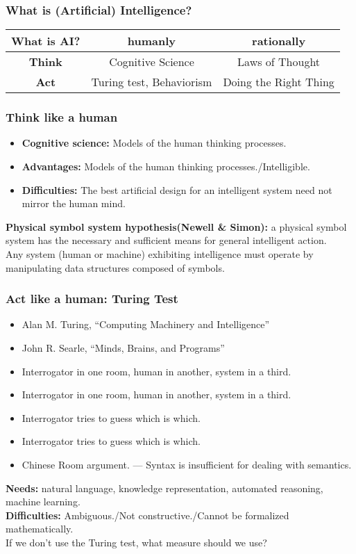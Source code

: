 \documentclass[UTF8,11pt,colorlinks,compress,openany]{beamer}%
\begin{document}
\begin{frame}\frametitle{What is (Artificial) Intelligence?}
\begin{table}
\begin{tabu}{c|c|c}
\hline
\textbf{What is AI?} &\textbf{humanly} &\textbf{rationally}\\
\hline
\textbf{Think} &Cognitive Science &Laws of Thought\\
\hline
\textbf{Act} &Turing test, Behaviorism &Doing the Right Thing\\
\hline
\end{tabu}
\end{table}
\end{frame}

\begin{frame}\frametitle{Think like a human}
\begin{itemize}
	\item \textbf{Cognitive science:} Models of the human thinking processes.
	\item \textbf{Advantages:} Models of the human thinking processes./Intelligible.
	\item \textbf{Difficulties:} The best artificial design for an intelligent system need not mirror the human mind.
\end{itemize}
\textbf{Physical symbol system hypothesis(Newell \& Simon):} a physical symbol system has the necessary and sufficient means for general intelligent action.\\
Any system (human or machine) exhibiting intelligence must operate by manipulating data structures composed of symbols.
\end{frame}

\begin{frame}\frametitle{Act like a human: Turing Test}
\begin{itemize}
	\item Alan M. Turing, ``Computing Machinery and Intelligence''
	\item John R. Searle, ``Minds, Brains, and Programs''
\end{itemize}
\begin{itemize}
	\item Interrogator in one room, human in another, system in a third.
	\item Interrogator in one room, human in another, system in a third.
	\item Interrogator tries to guess which is which.
	\item Interrogator tries to guess which is which.
	\item Chinese Room argument. --- Syntax is insufficient for dealing with semantics.
\end{itemize}
\textbf{Needs:} natural language, knowledge representation, automated reasoning, machine learning.\\
\textbf{Difficulties:} Ambiguous./Not constructive./Cannot be formalized mathematically.\\
\centering If we don't use the Turing test, what measure should we use?
\end{frame}
\end{document}
